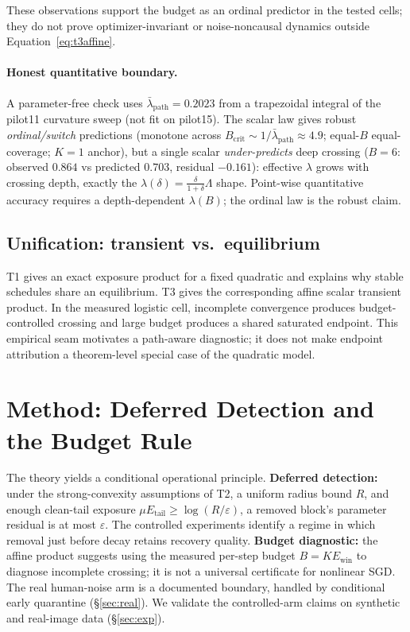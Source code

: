 \documentclass{article}
\newcommand{\Ewin}{E_{\mathrm{win}}}
\newcommand{\B}{B}            %
\newcommand{\lam}{\lambda}
\newcommand{\lampath}{\bar{\lam}_{\mathrm{path}}}
\begin{document}
These observations support the budget as an ordinal predictor in the tested cells; they do not
prove optimizer-invariant or noise-noncausal dynamics outside Equation~\ref{eq:t3affine}.
\paragraph{Honest quantitative boundary.} A parameter-free check uses
$\lampath=0.2023$ from a trapezoidal integral of the pilot11 curvature sweep (not fit on
pilot15). The scalar law gives robust \emph{ordinal/switch} predictions (monotone across
$\B_{\mathrm{crit}}\sim1/\lampath\approx4.9$; equal-$\B$ equal-coverage; $K{=}1$ anchor), but a
single scalar \emph{under-predicts} deep crossing ($\B=6$: observed $0.864$ vs predicted $0.703$,
residual $-0.161$): effective $\lambda$ grows with crossing depth, exactly the
$\lambda(\delta)=\frac{\delta}{1+\delta}\Lambda$ shape. Point-wise quantitative accuracy requires
a depth-dependent $\lambda(\B)$; the ordinal law is the robust claim.

\subsection{Unification: transient vs.\ equilibrium}
\label{sec:unify}
T1 gives an exact exposure product for a fixed quadratic and explains why stable schedules share
an equilibrium. T3 gives the corresponding affine scalar transient product. In the measured
logistic cell, incomplete convergence produces budget-controlled crossing and large budget
produces a shared saturated endpoint. This empirical seam motivates a path-aware diagnostic;
it does not make endpoint attribution a theorem-level special case of the quadratic model.

\section{Method: Deferred Detection and the Budget Rule}
\label{sec:method}

The theory yields a conditional operational principle. \textbf{Deferred detection:} under the
strong-convexity assumptions of T2, a uniform radius bound $R$, and enough clean-tail exposure
$\mu E_{\mathrm{tail}}\geq\log(R/\varepsilon)$, a removed block's parameter residual is at most
$\varepsilon$. The controlled experiments identify a regime in which removal just before decay
retains recovery quality. \textbf{Budget diagnostic:} the affine product suggests using the
measured per-step budget $\B=K\Ewin$ to diagnose incomplete crossing; it is not a universal
certificate for nonlinear SGD. The real human-noise arm is a documented boundary, handled by
conditional early quarantine (\S\ref{sec:real}). We validate the controlled-arm claims on
synthetic and real-image data (\S\ref{sec:exp}).
\end{document}
